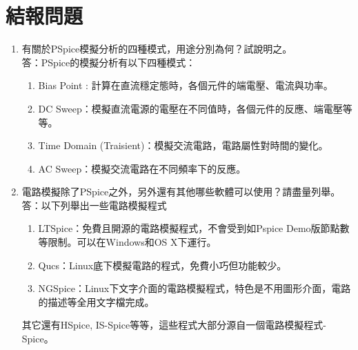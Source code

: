 \documentclass[12pt, a4paper]{article}
\def\large{\fontsize{14}{21}\selectfont}
\begin{document}
\section{結報問題}

\begin{enumerate}[itemsep=20pt, topsep=10pt]
	\item {\large 有關於PSpice模擬分析的四種模式，用途分別為何？試說明之。} \\[10pt]
		答：PSpice的模擬分析有以下四種模式：
		\begin{enumerate}[itemsep=0ex, topsep=0ex, label=(\arabic*)]
			\item Bias Point : 計算在直流穩定態時，各個元件的端電壓、電流與功率。
			\item DC Sweep：模擬直流電源的電壓在不同值時，各個元件的反應、端電壓等等。
			\item Time Domain (Traisient)：模擬交流電路，電路屬性對時間的變化。
			\item AC Sweep：模擬交流電路在不同頻率下的反應。
		\end{enumerate}

	\item {\large 電路模擬除了PSpice之外，另外還有其他哪些軟體可以使用？請盡量列舉。}\\[10pt]
		答：以下列舉出一些電路模擬程式
		\begin{enumerate}[itemsep=0ex, topsep=0ex, label=(\arabic*)]
			\item LTSpice：免費且開源的電路模擬程式，不會受到如Pspice Demo版節點數等限制。可以在Windows和OS X下運行。
			\item Qucs：Linux底下模擬電路的程式，免費小巧但功能較少。
			\item NGSpice：Linux下文字介面的電路模擬程式，特色是不用圖形介面，電路的描述等全用文字檔完成。
		\end{enumerate}
		其它還有HSpice, IS-Spice等等，這些程式大部分源自一個電路模擬程式- Spice。

\end{enumerate}
\end{document}
